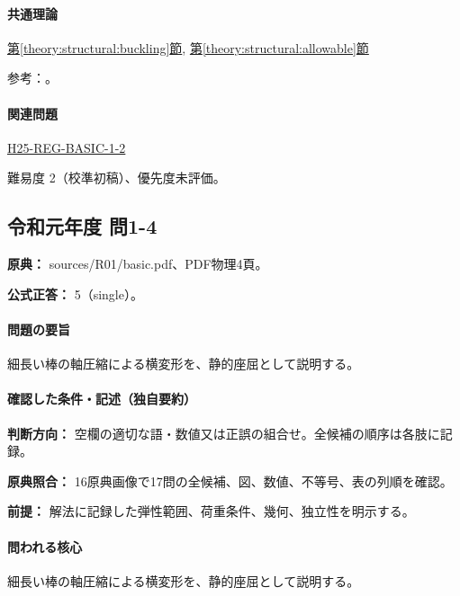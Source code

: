 \paragraph{共通理論} \hyperref[theory:structural:buckling]{第\ref*{theory:structural:buckling}節}, \hyperref[theory:structural:allowable]{第\ref*{theory:structural:allowable}節}

\par 参考：\cite{struct_mit_beam,struct_mit_buckling,struct_mlit_limit}。

\paragraph{関連問題} \hyperref[q:h25-reg-basic-1-2]{H25-REG-BASIC-1-2}

\par 難易度 2（校準初稿）、優先度未評価。

\subsection{令和元年度 問1-4}
\label{q:r01-reg-basic-1-4}

\noindent\textbf{原典：} sources/R01/basic.pdf、PDF物理4頁。

\textbf{公式正答：} 5（single）。

\paragraph{問題の要旨} 細長い棒の軸圧縮による横変形を、静的座屈として説明する。

\paragraph{確認した条件・記述（独自要約）}\mbox{}\par

\noindent\textbf{判断方向：} 空欄の適切な語・数値又は正誤の組合せ。全候補の順序は各肢に記録。\par

\noindent\textbf{原典照合：} 16原典画像で17問の全候補、図、数値、不等号、表の列順を確認。\par

\noindent\textbf{前提：} 解法に記録した弾性範囲、荷重条件、幾何、独立性を明示する。\par

\paragraph{問われる核心} 細長い棒の軸圧縮による横変形を、静的座屈として説明する。

